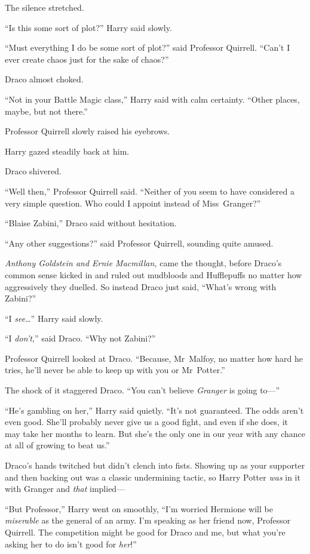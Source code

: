 The silence stretched.

“Is this some sort of plot?” Harry said slowly.

“Must everything I do be some sort of plot?” said Professor Quirrell.
“Can’t I ever create chaos just for the sake of chaos?”

Draco almost choked.

“Not in your Battle Magic class,” Harry said with calm certainty.
“Other places, maybe, but not there.”

Professor Quirrell slowly raised his eyebrows.

Harry gazed steadily back at him.

Draco shivered.

“Well then,” Professor Quirrell said.
“Neither of you seem to have considered a very simple question. Who could I appoint instead of Miss~Granger?”

“Blaise Zabini,” Draco said without hesitation.

“Any other suggestions?” said Professor Quirrell, sounding quite amused.

\emph{Anthony Goldstein and Ernie Macmillan,} came the thought, before Draco’s common sense kicked in and ruled out mudbloods and Hufflepuffs no matter how aggressively they duelled. So instead Draco just said,
“What’s wrong with Zabini?”

“I \emph{see}…” Harry said slowly.

“I \emph{don’t},” said Draco.
“Why not Zabini?”

Professor Quirrell looked at Draco.
“Because, Mr~Malfoy, no matter how hard he tries, he’ll never be able to keep up with you or Mr~Potter.”

The shock of it staggered Draco.
“You can’t believe \emph{Granger} is going to—”

“He’s gambling on her,” Harry said quietly.
“It’s not guaranteed. The odds aren’t even good. She’ll probably never give us a good fight, and even if she does, it may take her months to learn. But she’s the only one in our year with any chance at all of growing to beat us.”

Draco’s hands twitched but didn’t clench into fists. Showing up as your supporter and then backing out was a classic undermining tactic, so Harry Potter \emph{was} in it with Granger and \emph{that} implied—

“But Professor,” Harry went on smoothly,
“I’m worried Hermione will be \emph{miserable} as the general of an army. I’m speaking as her friend now, Professor Quirrell. The competition might be good for Draco and me, but what you’re asking her to do isn’t good for \emph{her}!”

